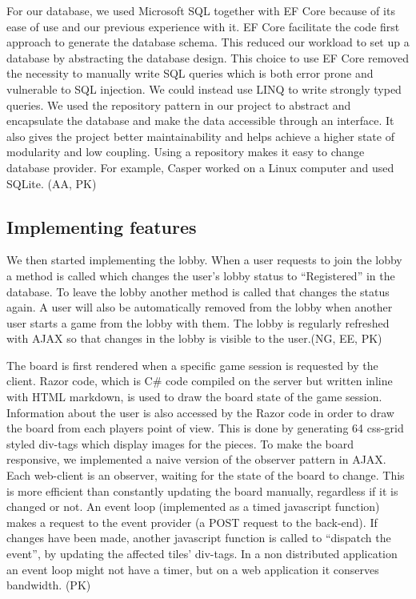 \documentclass[acmlarge, review=false, screen=true]{acmart}
\begin{document}
    For our database, we used Microsoft SQL together with EF Core because of its ease of use and our previous experience with it. EF Core facilitate the code first approach to generate the database schema. This reduced our workload to set up a database by abstracting the database design. This choice to use EF Core removed the necessity to manually write SQL queries which is both error prone and vulnerable to SQL injection. We could instead use LINQ to write strongly typed queries. We used the repository pattern in our project to abstract and encapsulate the database and make the data accessible through an interface. It also gives the project better maintainability and helps achieve a higher state of modularity and low coupling. Using a repository makes it easy to change database provider. For example, Casper worked on a Linux computer and used SQLite. (AA, PK)


  \subsection{Implementing features}
    We then started implementing the lobby. When a user requests to join the lobby a method is called which changes the user's lobby status to “Registered” in the database. To leave the lobby another method is called that changes the status again. A user will also be automatically removed from the lobby when another user starts a game from the lobby with them. The lobby is regularly refreshed with AJAX so that changes in the lobby is visible to the user.(NG, EE, PK)

    The board is first rendered when a specific game session is requested by the client. Razor code, which is C\# code compiled on the server but written inline with HTML markdown, is used to draw the board state of the game session\cite{razor}. Information about the user is also accessed by the Razor code in order to draw the board from each players point of view. This is done by generating 64 css-grid styled div-tags which display images for the pieces. To make the board responsive, we implemented a naive version of the observer pattern in AJAX\cite{ajax}. Each web-client is an observer, waiting for the state of the board to change. This is more efficient than constantly updating the board manually, regardless if it is changed or not. An event loop (implemented as a timed javascript function) makes a request to the event provider (a POST request to the back-end)\cite{event-loop}. If changes have been made, another javascript function is called to “dispatch the event”, by updating the affected tiles’ div-tags. In a non distributed application an event loop might not have a timer, but on a web application it conserves bandwidth. (PK)
\end{document}
